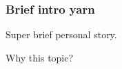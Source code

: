 \begin{frame}
\frametitle{Brief intro yarn}
Super brief personal story.

Why this topic?


\end{frame}